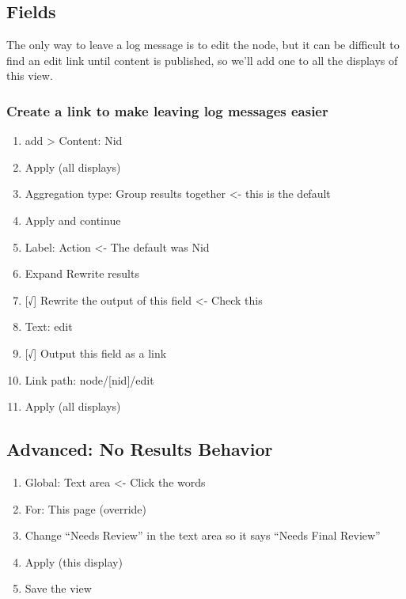 \documentclass[letterpaper,10pt,english]{sphinxmanual}
\begin{document}
\subsection{Fields}
\label{moderation:fields}
The only way to leave a log message is to edit the node, but it can be difficult to find an edit link until content is published, so we'll add one to all the displays of this view.


\subsubsection{Create a link to make leaving log messages easier}
\label{moderation:create-a-link-to-make-leaving-log-messages-easier}\begin{enumerate}
\item {} 
add \textgreater{} Content: Nid

\item {} 
Apply (all displays)

\item {} 
Aggregation type: Group results together \textless{}- this is the default

\item {} 
Apply and continue

\item {} 
Label: Action \textless{}- The default was Nid

\item {} 
Expand Rewrite results

\item {} 
{[}√{]} Rewrite the output of this field \textless{}- Check this

\item {} 
Text: edit

\item {} 
{[}√{]} Output this field as a link

\item {} 
Link path: node/{[}nid{]}/edit

\item {} 
Apply (all displays)

\end{enumerate}


\subsection{Advanced: No Results Behavior}
\label{moderation:advanced-no-results-behavior}\begin{enumerate}
\item {} 
Global: Text area \textless{}- Click the words

\item {} 
For: This page (override)

\item {} 
Change ``Needs Review'' in the text area so it says ``Needs Final Review''

\item {} 
Apply (this display)

\item {} 
Save the view

\end{enumerate}
\end{document}
